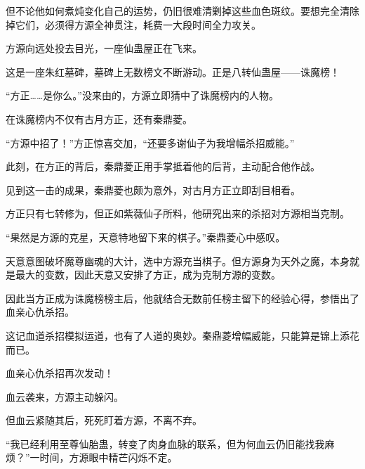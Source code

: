 \begin{this_body}
但不论他如何煮炖变化自己的运势，仍旧很难清剿掉这些血色斑纹。要想完全清除掉它们，必须得方源全神贯注，耗费一大段时间全力攻关。

方源向远处投去目光，一座仙蛊屋正在飞来。

这是一座朱红墓碑，墓碑上无数榜文不断游动。正是八转仙蛊屋——诛魔榜！

“方正……是你么。”没来由的，方源立即猜中了诛魔榜内的人物。

在诛魔榜内不仅有古月方正，还有秦鼎菱。

“方源中招了！”方正惊喜交加，“还要多谢仙子为我增幅杀招威能。”

此刻，在方正的背后，秦鼎菱正用手掌抵着他的后背，主动配合他作战。

见到这一击的成果，秦鼎菱也颇为意外，对古月方正立即刮目相看。

方正只有七转修为，但正如紫薇仙子所料，他研究出来的杀招对方源相当克制。

“果然是方源的克星，天意特地留下来的棋子。”秦鼎菱心中感叹。

天意意图破坏魔尊幽魂的大计，选中方源充当棋子。但方源身为天外之魔，本身就是最大的变数，因此天意又安排了方正，成为克制方源的变数。

因此当方正成为诛魔榜榜主后，他就结合无数前任榜主留下的经验心得，参悟出了血亲心仇杀招。

这记血道杀招模拟运道，也有了人道的奥妙。秦鼎菱增幅威能，只能算是锦上添花而已。

血亲心仇杀招再次发动！

血云袭来，方源主动躲闪。

但血云紧随其后，死死盯着方源，不离不弃。

“我已经利用至尊仙胎蛊，转变了肉身血脉的联系，但为何血云仍旧能找我麻烦？”一时间，方源眼中精芒闪烁不定。

\end{this_body}

